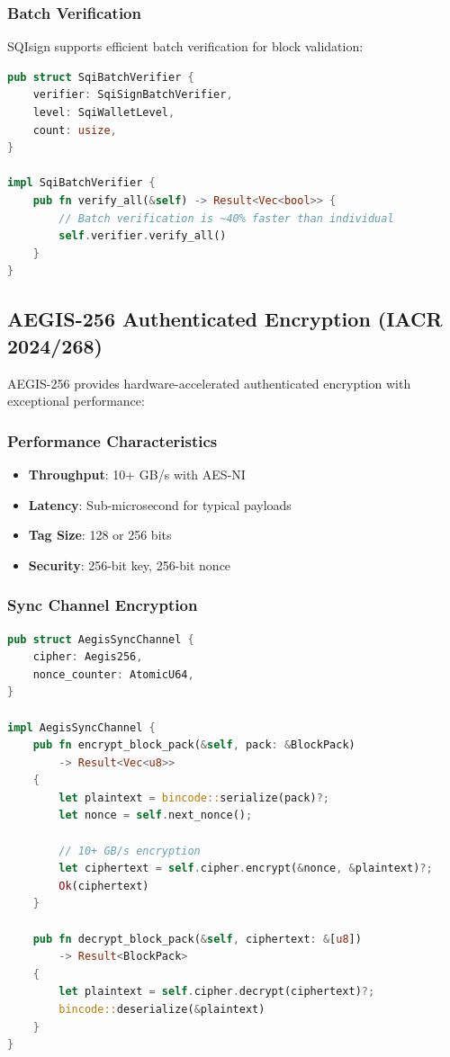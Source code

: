 \documentclass[11pt,a4paper]{article}
\begin{document}
\subsubsection{Batch Verification}

SQIsign supports efficient batch verification for block validation:

\begin{lstlisting}[language=Rust, caption=SQIsign Batch Verification]
pub struct SqiBatchVerifier {
    verifier: SqiSignBatchVerifier,
    level: SqiWalletLevel,
    count: usize,
}

impl SqiBatchVerifier {
    pub fn verify_all(&self) -> Result<Vec<bool>> {
        // Batch verification is ~40% faster than individual
        self.verifier.verify_all()
    }
}
\end{lstlisting}

\subsection{AEGIS-256 Authenticated Encryption (IACR 2024/268)}

AEGIS-256 provides hardware-accelerated authenticated encryption with exceptional performance:

\subsubsection{Performance Characteristics}

\begin{itemize}
    \item \textbf{Throughput}: 10+ GB/s with AES-NI
    \item \textbf{Latency}: Sub-microsecond for typical payloads
    \item \textbf{Tag Size}: 128 or 256 bits
    \item \textbf{Security}: 256-bit key, 256-bit nonce
\end{itemize}

\subsubsection{Sync Channel Encryption}

\begin{lstlisting}[language=Rust, caption=AEGIS-256 Sync Channel]
pub struct AegisSyncChannel {
    cipher: Aegis256,
    nonce_counter: AtomicU64,
}

impl AegisSyncChannel {
    pub fn encrypt_block_pack(&self, pack: &BlockPack)
        -> Result<Vec<u8>>
    {
        let plaintext = bincode::serialize(pack)?;
        let nonce = self.next_nonce();

        // 10+ GB/s encryption
        let ciphertext = self.cipher.encrypt(&nonce, &plaintext)?;
        Ok(ciphertext)
    }

    pub fn decrypt_block_pack(&self, ciphertext: &[u8])
        -> Result<BlockPack>
    {
        let plaintext = self.cipher.decrypt(ciphertext)?;
        bincode::deserialize(&plaintext)
    }
}
\end{lstlisting}
\end{document}
